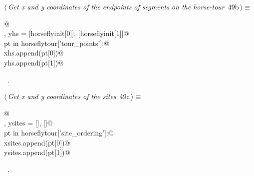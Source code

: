 \documentclass[11.5pt]{report}
\begin{document}
\vspace{-0.8cm} \newchunk
\begin{flushleft} \small
\begin{minipage}{\linewidth}\label{scrap74}\raggedright\small
{} $\langle\,${\itshape Get x and y coordinates of the endpoints of segments on the horse-tour}\nobreak\ {\footnotesize {49b}}$\,\rangle\equiv$
\vspace{-1ex}
\begin{list}{}{} \item
\mbox{}\verb@   @\\
\mbox{}\verb@xhs, yhs = [horseflyinit[0]], [horseflyinit[1]]@\\
\mbox{}\verb@for pt in horseflytour['tour_points']:@\\
\mbox{}\verb@    xhs.append(pt[0])@\\
\mbox{}\verb@    yhs.append(pt[1])@\\
\mbox{}\verb@@{\NWsep}
\end{list}
\vspace{-1.5ex}
\footnotesize
\begin{list}{}{\setlength{\itemsep}{-\parsep}\setlength{\itemindent}{-\leftmargin}}
\item \NWtxtMacroRefIn\ .

\item{}
\end{list}
\end{minipage}\vspace{4ex}
\end{flushleft}

\vspace{-0.8cm} \newchunk
\begin{flushleft} \small
\begin{minipage}{\linewidth}\label{scrap75}\raggedright\small
{} $\langle\,${\itshape Get x and y coordinates of the sites}\nobreak\ {\footnotesize {49c}}$\,\rangle\equiv$
\vspace{-1ex}
\begin{list}{}{} \item
\mbox{}\verb@   @\\
\mbox{}\verb@xsites, ysites = [], []@\\
\mbox{}\verb@for pt in horseflytour['site_ordering']:@\\
\mbox{}\verb@    xsites.append(pt[0])@\\
\mbox{}\verb@    ysites.append(pt[1])@\\
\mbox{}\verb@@{\NWsep}
\end{list}
\vspace{-1.5ex}
\footnotesize
\begin{list}{}{\setlength{\itemsep}{-\parsep}\setlength{\itemindent}{-\leftmargin}}
\item \NWtxtMacroRefIn\ .

\item{}
\end{list}
\end{minipage}\vspace{4ex}
\end{flushleft}
\end{document}
